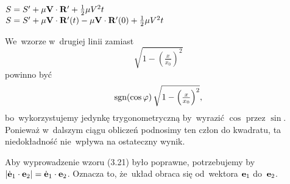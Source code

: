\documentclass[a4paper,11pt]{article}
\begin{document}
\noindent
{} \\
\Jest $S = S' + \mu \mathbf{V} \cdot \mathbf{R}' + \frac{ 1 }{ 2 } \mu V^{ 2 } t$ \\
\Powin $S = S' + \mu \mathbf{V} \cdot \mathbf{R}'( t ) - \mu \mathbf{V}
\cdot \mathbf{R}'( 0 ) + \frac{ 1 }{ 2 } \mu V^{ 2 } t$ \\


\vspace{\spaceTwo}














\start {} We~wzorze w~drugiej linii zamiast
\begin{equation}
  \label{eq:SkalmierskiMechanikaZWytrzymaloscia-01}
  \sqrt{ 1 - \left( \tfrac{ x }{ x_{ 0 } } \right)^{ 2 } }
\end{equation}
powinno być
\begin{equation}
  \label{eq:SkalmierskiMechanikaZWytrzymaloscia-02}
  \textrm{sgn}( \cos \varphi ) \,
  \sqrt{ 1 - \left( \tfrac{ x }{ x_{ 0 } } \right)^{ 2 } },
\end{equation}
bo~wykorzystujemy jedynkę trygonometryczną by~wyrazić $\cos$ przez
$\sin$. Ponieważ w~dalszym ciągu obliczeń podnosimy ten człon do
kwadratu, ta niedokładność nie~wpływa na ostateczny wynik.

\vspace{\spaceFour}



\start {} Aby wyprowadzenie wzoru (3.21) było poprawne,
potrzebujemy by
$| \dot{ \mathbf{e} }_{ 1 } \cdot \mathbf{e}_{ 2 } | = \dot{ \mathbf{e} }_{ 1 }
\cdot \mathbf{e}_{ 2 }$. Oznacza to, że~układ obraca się od~wektora $\mathbf{e}_{ 1 }$
do~$\mathbf{e}_{ 2 }$.




\end{document}

